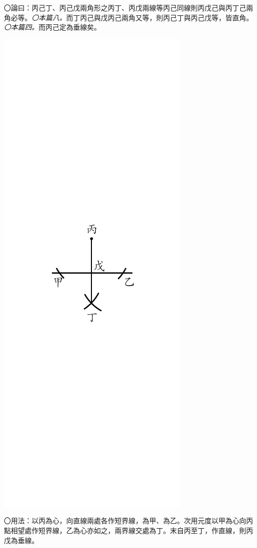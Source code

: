 \documentclass[12pt,b5paper,landscape]{article}
\newcommand{\ccom}[1]{{\footnotesize \emph{〇#1}}}
\newcommand{\bcom}[1]{〇#1}
\begin{document}
\begin{multicols}{2}
\bcom{論曰：丙己丁、丙己戊兩角形之丙丁、丙戊兩線等丙己同線則丙戊己與丙丁己兩角必等。\ccom{本篇八。}而丁丙己與戊丙己兩角又等，則丙己丁與丙己戊等，皆直角。\ccom{本篇四。}而丙己定為垂線矣。}
\begin{center}
\includegraphics[angle=90]{eu56}
\end{center}
\bcom{用法：以丙為心，向直線兩處各作短界線，為甲、為乙。次用元度以甲為心向丙點相望處作短界線，乙為心亦如之，兩界線交處為丁。末自丙至丁，作直線，則丙戊為垂線。}

\end{multicols}
\end{document}

